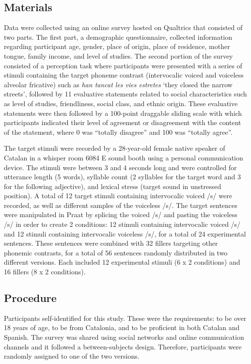 \documentclass[
  a4paper,
  11pt,
  twocolumn]{article}
\begin{document}
\subsection{Materials}

Data were collected using an online survey hosted on Qualtrics that
consisted of two parts. The first part, a demographic questionnaire,
collected information regarding participant age, gender, place of
origin, place of residence, mother tongue, family income, and level of
studies. The second portion of the survey consisted of a perception task
where participants were presented with a series of stimuli containing
the target phoneme contrast (intervocalic voiced and voiceless alveolar
fricative) such as \emph{han tancat les vies estretes} `they closed the
narrow streets', followed by 11 evaluative statements related to social
characteristics such as level of studies, friendliness, social class,
and ethnic origin. These evaluative statements were then followed by a
100-point draggable sliding scale with which participants indicated
their level of agreement or disagreement with the content of the
statement, where 0 was ``totally disagree'' and 100 was ``totally
agree''.

The target stimuli were recorded by a 28-year-old female native speaker
of Catalan in a whisper room 6084 E sound booth using a personal
communication device. The stimuli were between 3 and 4 seconds long and
were controlled for utterance length (5 words), syllable count (2
syllables for the target word and 3 for the following adjective), and
lexical stress (target sound in unstressed position). A total of 12
target stimuli containing intervocalic voiced /s/ were recorded, as well
as different samples of the voiceless /s/. The target sentences were
manipulated in Praat by splicing the voiced /s/ and pasting the
voiceless /s/ in order to create 2 conditions: 12 stimuli containing
intervocalic voiced /s/ and 12 stimuli containing intervocalic voiceless
/s/, for a total of 24 experimental sentences. These sentences were
combined with 32 fillers targeting other phonemic contrasts, for a total
of 56 sentences randomly distributed in two different versions. Each
included 12 experimental stimuli (6 x 2 conditions) and 16 fillers (8 x
2 conditions).

\subsection{Procedure}

Participants self-identified for this study. These were the
requirements: to be over 18 years of age, to be from Catalonia, and to
be proficient in both Catalan and Spanish. The survey was shared using
social networks and online communication channels and it followed a
between-subjects design. Therefore, participants were randomly assigned
to one of the two versions.
\end{document}
